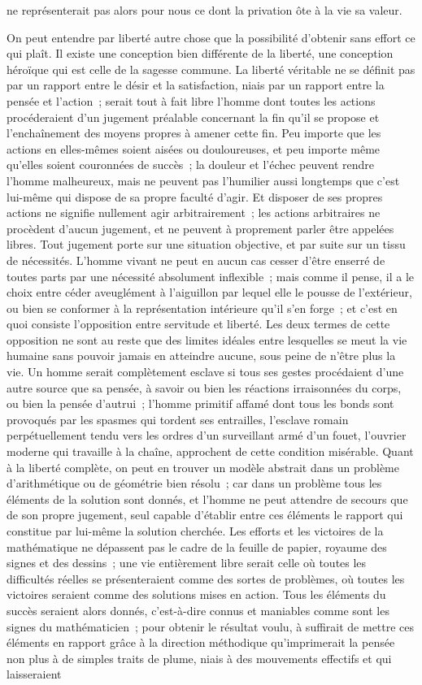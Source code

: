 \documentclass[french,twoside]{book} %
\begin{document}
ne représenterait pas alors pour nous ce dont la privation ôte à la vie sa valeur.\par
On peut entendre par liberté autre chose que la possibilité d'obtenir sans effort ce qui plaît. Il existe une conception bien différente de la liberté, une conception héroïque qui est celle de la sagesse commune. La liberté véritable ne se définit pas par un rapport entre le désir et la satisfaction, niais par un rapport entre la pensée et l'action ; serait tout à fait libre l'homme dont toutes les actions procéderaient d'un jugement préalable concernant la fin qu'il se propose et l'enchaînement des moyens propres à amener cette fin. Peu importe que les actions en elles-mêmes soient aisées ou douloureuses, et peu importe même qu'elles soient couronnées de succès ; la douleur et l'échec peuvent rendre l'homme malheureux, mais ne peuvent pas l'humilier aussi longtemps que c'est lui-même qui dispose de sa propre faculté d'agir. Et disposer de ses propres actions ne signifie nullement agir arbitrairement ; les actions arbitraires ne procèdent d'aucun jugement, et ne peuvent à proprement parler être appelées libres. Tout jugement porte sur une situation objective, et par suite sur un tissu de nécessités. L'homme vivant ne peut en aucun cas cesser d'être enserré de toutes parts par une nécessité absolument inflexible ; mais comme il pense, il a le choix entre céder aveuglément à l'aiguillon par lequel elle le pousse de l'extérieur, ou bien se conformer à la représentation intérieure qu'il s'en forge ; et c'est en quoi consiste l'opposition entre servitude et liberté. Les deux termes de cette opposition ne sont au reste que des limites idéales entre lesquelles se meut la vie humaine sans pouvoir jamais en atteindre aucune, sous peine de n'être plus la vie. Un homme serait complètement esclave si tous ses gestes procédaient d'une autre source que sa pensée, à savoir ou bien les réactions irraisonnées du corps, ou bien la pensée d'autrui ; l'homme primitif affamé dont tous les bonds sont provoqués par les spasmes qui tordent ses entrailles, l'esclave romain perpétuellement tendu vers les ordres d'un surveillant armé d'un fouet, l'ouvrier moderne qui travaille à la chaîne, approchent de cette condition misérable. Quant à la liberté complète, on peut en trouver un modèle abstrait dans un problème d'arithmétique ou de géométrie bien résolu ; car dans un problème tous les éléments de la solution sont donnés, et l'homme ne peut attendre de secours que de son propre jugement, seul capable d'établir entre ces éléments le rapport qui constitue par lui-même la solution cherchée. Les efforts et les victoires de la mathématique ne dépassent pas le cadre de la feuille de papier, royaume des signes et des dessins ; une vie entièrement libre serait celle où toutes les difficultés réelles se présenteraient comme des sortes de problèmes, où toutes les victoires seraient comme des solutions mises en action. Tous les éléments du succès seraient alors donnés, c'est-à-dire connus et maniables comme sont les signes du mathématicien ; pour obtenir le résultat voulu, à suffirait de mettre ces éléments en rapport grâce à la direction méthodique qu'imprimerait la pensée non plus à de simples traits de plume, niais à des mouvements effectifs et qui laisseraient 
\end{document}
